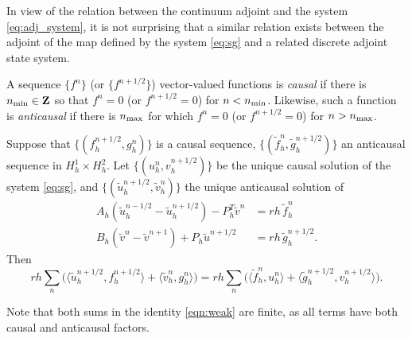 In view of the relation between the continuum adjoint and the system
\ref{eq:adj_system}, it is not surprising that a similar relation
exists between the adjoint of the map defined by the system
\ref{eq:sg} and a related discrete adjoint state system. 

A sequence $\{f^n\}$ (or $\{f^{n+1/2}\}$) vector-valued functions is {\em causal} if there is
$n_{\rm min} \in {\bf Z}$ so that $f^n=0$ (or $f^{n+1/2}=0$) for
$n<n_{\rm min}$. Likewise, such a function is {\em anticausal} if
there is $n_{\rm max}$ for which  $f^n=0$ (or $f^{n+1/2}=0$) for
$n>n_{\rm max}$. 

\begin{theorem}
Suppose that $\{(f_h^{n+1/2},g_h^{n})\}$ is a causal sequence,
$\{(\tilde{f}_h^{n},\tilde{g}_h^{n+1/2})\}$ an anticausal
sequence in $H^1_h \times H^2_h$.
Let $\{ (u_h^n,v_h^{n+1/2})\}$ be the unique causal solution of 
the system \ref{eq:sg}, and
 $\{(\tilde u_h^{n+1/2},\tilde v_h^{n})\}$ the unique anticausal
solution of
\begin{equation}\label{eqn:inadj}
\begin{split}
	A_h( \tilde u_h^{n-1/2}-\tilde u_h^{n+1/2} ) - P_h^T \tilde v^n & =  rh\, \tilde f_h^{n} \\
	B_h( \tilde v^{n} - \tilde v^{n+1} ) + P_h \tilde u^{n+1/2} &=  rh \, \tilde g_h^{n+1/2}. 
\end{split}
\end{equation}
Then 
\begin{equation}
\label{eqn:weak}
	 rh\sum_{n} \Big( \langle \tilde u_h^{n+1/2}, f_h^{n+1/2} \rangle +
	 			 	  \langle \tilde v_h^n, g_h^n \rangle \Big) 
	= rh\sum_{n} \Big( \langle \tilde f_h^n, u_h^n \rangle + 
					     \langle \tilde g_h^{n+1/2}, v_h^{n+1/2}\rangle \Big). 
\end{equation}
\end{theorem}

Note that both sums in the identity \ref{eqn:weak} are finite, as all
terms have both causal and anticausal factors.

